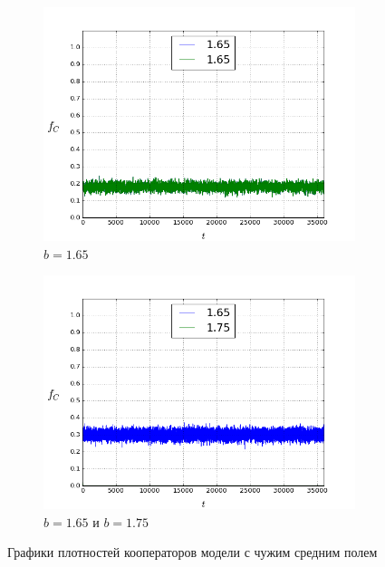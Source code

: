 \documentclass[a4paper]{article}
\begin{document}
\begin{figure}
	\begin{subfigure}{.5\textwidth}
		\includegraphics[width=.8\linewidth]{165-165.png}
		\caption{$b=1.65$}
	\end{subfigure}
	\begin{subfigure}{.5\textwidth}
		\includegraphics[width=.8\linewidth]{165-175.png}
		\caption{$b=1.65$ и $b=1.75$}
	\end{subfigure}%
	\caption{Графики плотностей кооператоров модели с чужим средним полем}
\end{figure}
\end{document}
